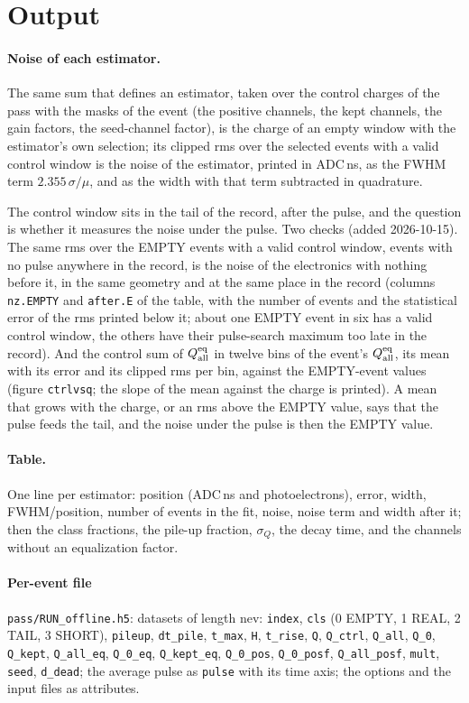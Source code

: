 \documentclass[11pt]{article}
\newcommand{\code}[1]{\texttt{#1}}
\begin{document}
\section{Output}

\paragraph{Noise of each estimator.} The same sum that defines an
estimator, taken over the control charges of the pass with the masks of
the event (the positive channels, the kept channels, the gain factors,
the seed-channel factor), is the charge of an empty window with the
estimator's own selection; its clipped rms over the selected events with
a valid control window is the noise of the estimator, printed in
ADC\,ns, as the FWHM term $2.355\,\sigma/\mu$, and as the width with that
term subtracted in quadrature.

The control window sits in the tail of the record, after the pulse, and
the question is whether it measures the noise under the pulse. Two checks
(added 2026-10-15). The same rms over the EMPTY events with a valid
control window, events with no pulse anywhere in the record, is the
noise of the electronics with nothing before it, in the same geometry
and at the same place in the record (columns \code{nz.EMPTY} and
\code{after.E} of the table, with the number of events and the
statistical error of the rms printed below it; about one EMPTY event in
six has a valid control window, the others have their pulse-search
maximum too late in the record). And the control sum of
$Q^{\rm eq}_{\rm all}$ in twelve bins of the event's
$Q^{\rm eq}_{\rm all}$, its mean with its error and its clipped rms per
bin, against the EMPTY-event values (figure \code{ctrlvsq}; the slope of
the mean against the charge is printed). A mean that grows with the
charge, or an rms above the EMPTY value, says that the pulse feeds the
tail, and the noise under the pulse is then the EMPTY value.

\paragraph{Table.} One line per estimator: position (ADC\,ns and
photoelectrons), error, width, FWHM/position, number of events in the
fit, noise, noise term and width after it; then the class fractions, the
pile-up fraction, $\sigma_Q$, the decay time, and the channels without an
equalization factor.

\paragraph{Per-event file} \code{pass/RUN\_offline.h5}: datasets of length
nev: \code{index}, \code{cls} (0 EMPTY, 1 REAL, 2 TAIL, 3 SHORT), \code{pileup},
\code{dt\_pile}, \code{t\_max}, \code{H}, \code{t\_rise}, \code{Q},
\code{Q\_ctrl}, \code{Q\_all}, \code{Q\_0}, \code{Q\_kept},
\code{Q\_all\_eq}, \code{Q\_0\_eq}, \code{Q\_kept\_eq}, \code{Q\_0\_pos},
\code{Q\_0\_posf}, \code{Q\_all\_posf},
\code{mult}, \code{seed}, \code{d\_dead}; the
average pulse as \code{pulse} with its time axis; the options and the
input files as attributes.
\end{document}
